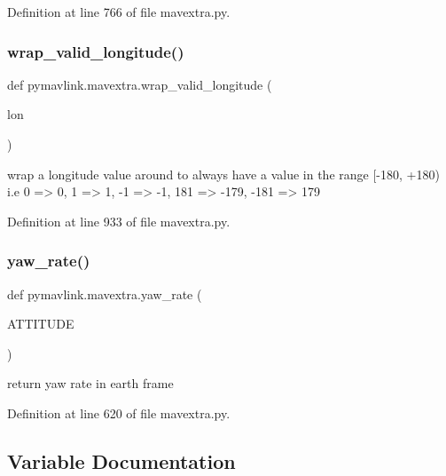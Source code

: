 Definition at line 766 of file mavextra.\+py.

\mbox{\label{namespacepymavlink_1_1mavextra_ab34a549c8b911b6455f2d641af495192}} 
\subsubsection{\texorpdfstring{wrap\_valid\_longitude()}{wrap\_valid\_longitude()}}
{\footnotesize\ttfamily def pymavlink.\+mavextra.\+wrap\+\_\+valid\+\_\+longitude (\begin{DoxyParamCaption}\item[{}]{lon }\end{DoxyParamCaption})}

\begin{DoxyVerb}wrap a longitude value around to always have a value in the range
    [-180, +180) i.e 0 => 0, 1 => 1, -1 => -1, 181 => -179, -181 => 179
\end{DoxyVerb}
 

Definition at line 933 of file mavextra.\+py.

\mbox{\label{namespacepymavlink_1_1mavextra_af1b42c28fc778624954bc9bb5307fcf6}} 
\subsubsection{\texorpdfstring{yaw\_rate()}{yaw\_rate()}}
{\footnotesize\ttfamily def pymavlink.\+mavextra.\+yaw\+\_\+rate (\begin{DoxyParamCaption}\item[{}]{A\+T\+T\+I\+T\+U\+DE }\end{DoxyParamCaption})}

\begin{DoxyVerb}return yaw rate in earth frame\end{DoxyVerb}
 

Definition at line 620 of file mavextra.\+py.



\subsection{Variable Documentation}
\mbox{\label{namespacepymavlink_1_1mavextra_a76fcc483634240cbd986407ea04000e3}} 
